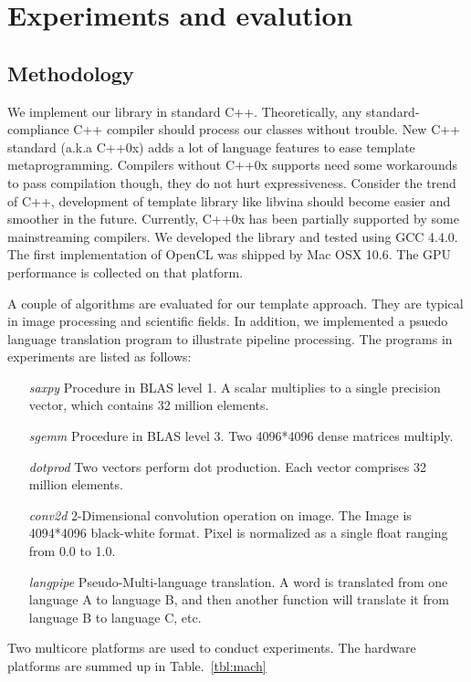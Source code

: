 \documentclass[10pt, conference, compsocconf]{IEEEtran}
\begin{document}
\section{Experiments and evalution}
\subsection{Methodology}\label{sectn:method}
We implement our library in standard
C++\cite{c++03, c++0x}. Theoretically, any standard-compliance C++ compiler
should process our classes without trouble. New C++ standard (a.k.a C++0x)\cite{c++0x} adds a
lot of language features to ease template metaprogramming. Compilers
without C++0x supports need some workarounds to pass compilation
though, they do not hurt expressiveness. Consider the trend of C++,
development of template library like libvina should become easier
and smoother in the future.  Currently, C++0x has been partially supported by some mainstreaming
compilers.  We developed the library and tested using GCC 4.4.0.  The
first implementation of OpenCL was shipped by Mac OSX 10.6. The GPU performance is collected on that platform.

A couple of algorithms are evaluated for our template approach.  They
are typical in image processing and scientific fields. In
addition, we implemented a psuedo language translation program to
illustrate pipeline processing. The programs in experiments are listed
as follows:

\begin{itemize}
\item[\textit{saxpy}] Procedure in BLAS level 1. A scalar multiplies to a single precision vector, which contains 32 million elements.
\item[\textit{sgemm}] Procedure in BLAS level 3. Two 4096*4096 dense matrices multiply.
\item[\textit{dotprod}] Two vectors perform dot production. Each vector
  comprises 32 million elements.
\item[\textit{conv2d}] 2-Dimensional convolution operation on image.  The Image
  is 4094*4096 black-white format. Pixel is normalized as a single
  float ranging from 0.0 to 1.0.
\item[\textit{langpipe}] Pseudo-Multi-language translation. A word is translated from one language A to language B, and then another function will translate it from language B to language C, etc.
\end{itemize}

Two multicore platforms are used to conduct experiments. The hardware
platforms are summed up in Table.~\ref{tbl:mach}
\end{document}
